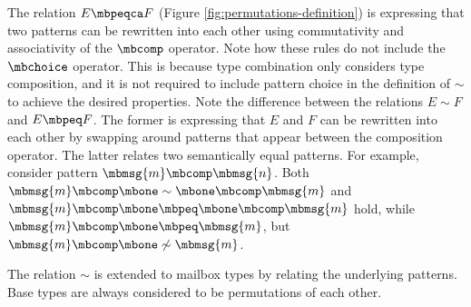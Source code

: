 The relation $E \mbpeqca F$ (Figure \ref{fig:permutations-definition}) is expressing that two patterns can be rewritten into each other using commutativity and associativity of the $\mbcomp$ operator.
Note how these rules do not include the $\mbchoice$ operator.
This is because type combination only considers type composition, and it is not required to include pattern choice in the definition of $\sim$ to achieve the desired properties.
Note the difference between the relations $E \sim F$ and $E \mbpeq F$.
The former is expressing that $E$ and $F$ can be rewritten into each other by swapping around patterns that appear between the composition operator.
The latter relates two semantically equal patterns.
For example, consider pattern $\mbmsg{m} \mbcomp \mbmsg{n}$.
Both $\mbmsg{m} \mbcomp \mbone \sim \mbone \mbcomp \mbmsg{m}$ and $\mbmsg{m} \mbcomp \mbone \mbpeq \mbone \mbcomp \mbmsg{m}$ hold,
while $\mbmsg{m} \mbcomp \mbone \mbpeq \mbmsg{m}$, but $\mbmsg{m} \mbcomp \mbone \not\sim \mbmsg{m}$.


%

The relation $\sim$ is extended to mailbox types by relating the underlying patterns.
Base types are always considered to be permutations of each other.

